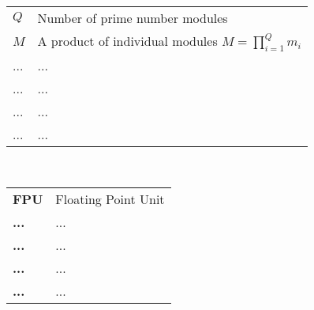 \\

\begin{tabular}{ll}
$Q$ & Number of prime number modules\\
$M$ & A product of individual modules $M=\prod\limits_{i=1}^Q m_i$\\
... & ...\\
... & ...\\
... & ...\\
... & ...\\
\end{tabular}
\vskip 1cm

\\

\begin{tabular}{ll}
{\bf FPU} & Floating Point Unit\\
{\bf ...} & ...\\
{\bf ...} & ...\\
{\bf ...} & ...\\
{\bf ...} & ...\\
\end{tabular}
\vskip 1cm
